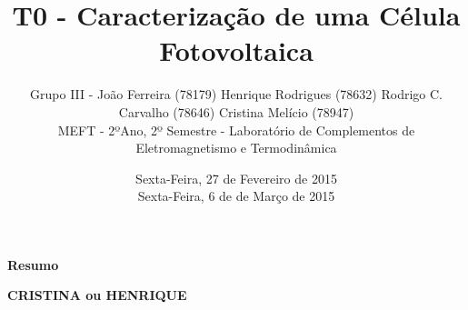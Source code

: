 \documentclass[9pt]{extarticle}
\renewenvironment{abstract}
 {\small
  \begin{center}
  \bfseries \abstractname\vspace{-.5em}\vspace{0pt}
  \end{center}
  \list{}{
    \setlength{\leftmargin}{0cm}%
    \setlength{\rightmargin}{\leftmargin}%
  }%
  \item\relax}
 {\endlist}
\renewcommand{\abstractname}{Resumo}
\begin{document}
\title {\bf \huge T0 - Caracterização de uma Célula Fotovoltaica}
\author
{{\small Grupo III - João Ferreira (78179) Henrique Rodrigues (78632) Rodrigo C. Carvalho (78646) Cristina Melício (78947)} \\
{\small MEFT - 2ºAno, 2º Semestre - Laboratório de Complementos de Eletromagnetismo e Termodinâmica}}
\date{{\small Sexta-Feira, 27 de Fevereiro de 2015 \\ Sexta-Feira, 6 de de Março de 2015}}
\maketitle

\begin{abstract}
\par \textbf{CRISTINA ou HENRIQUE}
\end{abstract}
\end{document}
